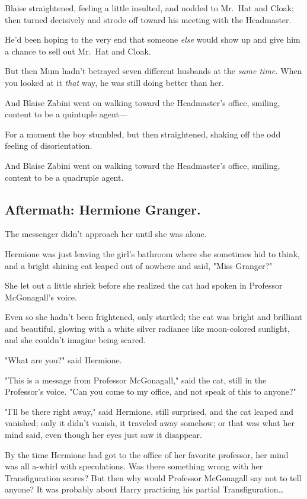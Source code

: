 Blaise straightened, feeling a little insulted, and nodded to Mr.~Hat and 
Cloak; then turned decisively and strode off toward his meeting with the 
Headmaster.

He'd been hoping to the very end that someone \emph{else} would show up and 
give him a chance to sell out Mr.~Hat and Cloak.

But then Mum hadn't betrayed seven different husbands at the \emph{same time.} 
When you looked at it \emph{that} way, he was still doing better than her.

And Blaise Zabini went on walking toward the Headmaster's office, smiling, 
content to be a quintuple agent---

For a moment the boy stumbled, but then straightened, shaking off the odd 
feeling of disorientation.

And Blaise Zabini went on walking toward the Headmaster's office, smiling, 
content to be a quadruple agent.
\sbreak
\vspace{-2\baselineskip}
\subsection{Aftermath: Hermione Granger.}

The messenger didn't approach her until she was alone.

Hermione was just leaving the girl's bathroom where she sometimes hid to think, 
and a bright shining cat leaped out of nowhere and said, "Miss Granger?"

She let out a little shriek before she realized the cat had spoken in Professor 
McGonagall's voice.

Even so she hadn't been frightened, only startled; the cat was bright and 
brilliant and beautiful, glowing with a white silver radiance like moon-colored 
sunlight, and she couldn't imagine being scared.

"What are you?" said Hermione.

"This is a message from Professor McGonagall," said the cat, still in the 
Professor's voice. "Can you come to my office, and not speak of this to anyone?"

"I'll be there right away," said Hermione, still surprised, and the cat leaped 
and vanished; only it didn't vanish, it traveled away somehow; or that was what 
her mind said, even though her eyes just saw it disappear.

By the time Hermione had got to the office of her favorite professor, her mind 
was all a-whirl with speculations. Was there something wrong with her 
Transfiguration scores? But then why would Professor McGonagall say not to tell 
anyone? It was probably about Harry practicing his partial 
Transfiguration{\ldots}

